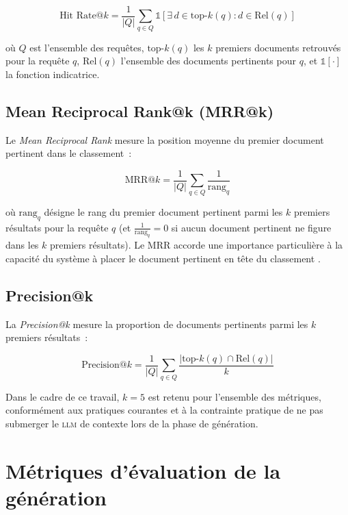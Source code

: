 \documentclass[12pt,a4paper,oneside]{report}
\newcommand{\llm}{\textsc{llm}}
\begin{document}
\begin{equation}
\text{Hit Rate@}k = \frac{1}{|Q|} \sum_{q \in Q} \mathbb{1}\left[\exists\, d \in \text{top-}k(q) : d \in \text{Rel}(q)\right]
\label{eq:hitrate}
\end{equation}

\noindent où $Q$ est l'ensemble des requêtes, $\text{top-}k(q)$ les $k$ premiers documents retrouvés pour la requête $q$, $\text{Rel}(q)$ l'ensemble des documents pertinents pour $q$, et $\mathbb{1}[\cdot]$ la fonction indicatrice.

\subsection{Mean Reciprocal Rank@k (MRR@k)}

Le \textit{Mean Reciprocal Rank} mesure la position moyenne du premier document pertinent dans le classement~:

\begin{equation}
\text{MRR@}k = \frac{1}{|Q|} \sum_{q \in Q} \frac{1}{\text{rang}_q}
\label{eq:mrr}
\end{equation}

\noindent où $\text{rang}_q$ désigne le rang du premier document pertinent parmi les $k$ premiers résultats pour la requête $q$ (et $\frac{1}{\text{rang}_q} = 0$ si aucun document pertinent ne figure dans les $k$ premiers résultats). Le MRR accorde une importance particulière à la capacité du système à placer le document pertinent en tête du classement \citep{manning2008}.

\subsection{Precision@k}

La \textit{Precision@k} mesure la proportion de documents pertinents parmi les $k$ premiers résultats~:

\begin{equation}
\text{Precision@}k = \frac{1}{|Q|} \sum_{q \in Q} \frac{|\text{top-}k(q) \cap \text{Rel}(q)|}{k}
\label{eq:precision}
\end{equation}

Dans le cadre de ce travail, $k = 5$ est retenu pour l'ensemble des métriques, conformément aux pratiques courantes et à la contrainte pratique de ne pas submerger le \llm{} de contexte lors de la phase de génération.

\section{Métriques d'évaluation de la génération}
\label{sec:metriques_generation}
\end{document}
